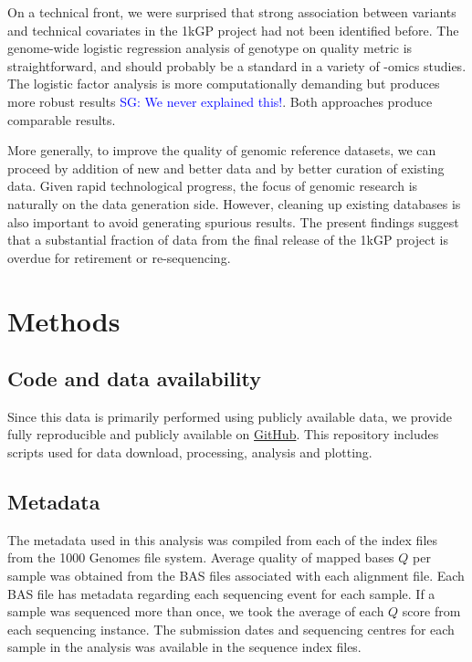 \documentclass[9pt,lineno]{template}
\newcommand{\sgcomment}[1]{\textcolor{blue}{SG: #1}}
\begin{document}
On a technical front, we were surprised that strong association between variants and technical covariates in the 1kGP project had not been identified before. 
The genome-wide logistic regression analysis of genotype on quality metric is straightforward, and should probably be a standard in a variety of -omics studies. The logistic factor analysis is more computationally demanding but produces more robust results \sgcomment{We never explained this!}. Both approaches produce comparable results.  

More generally, to improve the quality of genomic reference datasets, we can proceed by addition of new and better data and by better curation of existing data.
Given rapid technological progress, the focus of genomic research is naturally on the data generation side. 
However, cleaning up existing databases is also important to avoid generating spurious results. 
The present findings suggest that a substantial fraction of data from the final release of the 1kGP project is overdue for retirement or re-sequencing.


\section{Methods}
\subsection{Code and data availability}
Since this data is primarily performed using publicly available data, we provide fully reproducible and publicly available on \href{https://github.com/LukeAndersonTrocme/LegacyData}{GitHub}.
This repository includes scripts used for data download, processing, analysis and plotting.

\subsection{Metadata}
The metadata used in this analysis was compiled from each of the index files from the 1000 Genomes file system. 
Average quality of mapped bases $Q$ per sample was obtained from the BAS files associated with each alignment file.
Each BAS file has metadata regarding each sequencing event for each sample. 
If a sample was sequenced more than once, we took the average of each $Q$ score from each sequencing instance. 
The submission dates and sequencing centres for each sample in the analysis was available in the sequence index files.
\end{document}
